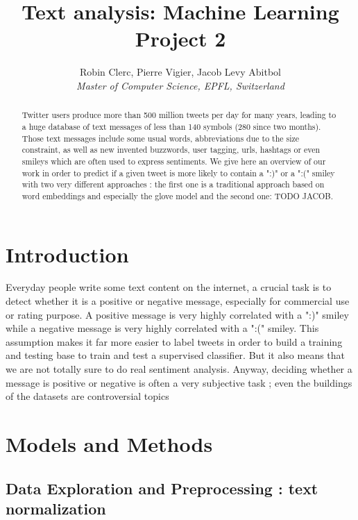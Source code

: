 \documentclass[10pt,conference,compsocconf]{IEEEtran}
\begin{document}
\title{Text analysis: Machine Learning Project 2}

\author{
  Robin Clerc, Pierre Vigier, Jacob Levy Abitbol\\
  \textit{Master of Computer Science, EPFL, Switzerland}
}

\maketitle

\begin{abstract}
Twitter users produce more than 500 million tweets per day for many years, leading to a huge database of text messages of less than 140 symbols (280 since two months). Those text messages include some usual words, abbreviations due to the size constraint, as well as new invented buzzwords, user tagging, urls, hashtags or even smileys which are often used to express sentiments. We give here an overview of our work in order to predict if a given tweet is more likely to contain a ":)" or a ":(" smiley with two very different approaches : the first one is a traditional approach based on word embeddings and especially the glove model and the second one: TODO JACOB.
\end{abstract}

\section{Introduction}

Everyday people write some text content on the internet, a crucial task is to detect whether it is a positive or negative message, especially for commercial use or rating purpose. A positive message is very highly correlated with a ":)" smiley while a negative message is very highly correlated with a ":(" smiley. This assumption makes it far more easier to label tweets in order to build a training and testing base to train and test a supervised classifier. But it also means that we are not totally sure to do real sentiment analysis. Anyway, deciding whether a message is positive or negative is often a very subjective task ; even the buildings of the datasets are controversial topics

\section{Models and Methods}
\label{sec:structure-paper}

\subsection{Data Exploration and Preprocessing : text normalization}
\end{document}

